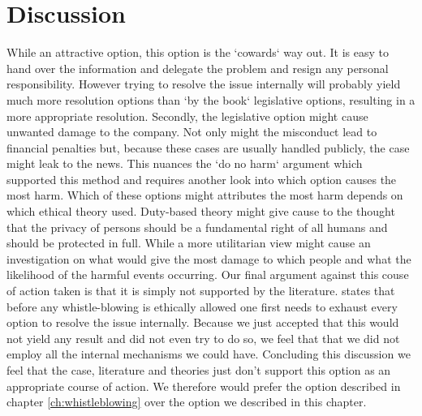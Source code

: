 \section{Discussion}
While an attractive option, this option is the `cowards` way out. It is easy to hand over the information and delegate the problem and resign any personal responsibility. However trying to resolve the issue internally will probably yield much more resolution options than `by the book` legislative options, resulting in a more appropriate resolution.
Secondly, the legislative option might cause unwanted damage to the company. Not only might the misconduct lead to financial penalties but, because these cases are usually handled publicly, the case might leak to the news. This nuances the `do no harm` argument which supported this method and requires another look into which option causes the most harm. Which of these options might attributes the most harm depends on which ethical theory used. Duty-based theory might give cause to the thought that the privacy of persons should be a fundamental right of all humans and should be protected in full. While a more utilitarian view might cause an investigation on what would give the most damage to which people and what the likelihood of the harmful events occurring.
Our final argument against this couse of action taken is that it is simply not supported by the literature. \cite{whistleblowing_paradoxes} states that before any whistle-blowing is ethically allowed one first needs to exhaust every option to resolve the issue internally. Because we just accepted that this would not yield any result and did not even try to do so, we feel that that we did not employ all the internal mechanisms we could have.
Concluding this discussion we feel that the case, literature and theories just don't support this option as an appropriate course of action. We therefore would prefer the option described in chapter \ref{ch:whistleblowing} over the option we described in this chapter.